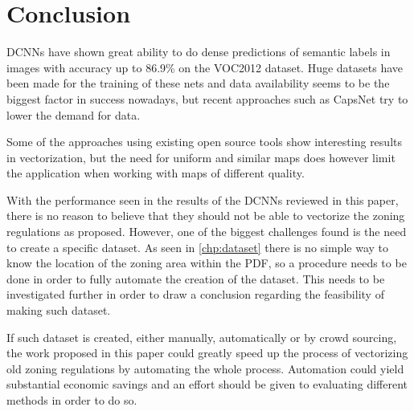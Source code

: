 \chapter{Conclusion}
DCNNs have shown great ability to do dense predictions of semantic labels in images with accuracy up to 86.9\% on the VOC2012 dataset. Huge datasets have been made for the training of these nets and data availability seems to be the biggest factor in success nowadays, but recent approaches such as CapsNet \cite{Sabour2017} try to lower the demand for data.

Some of the approaches using existing open source tools show interesting results in vectorization, but the need for uniform and similar maps does however limit the application when working with maps of different quality.

With the performance seen in the results of the DCNNs reviewed in this paper, there is no reason to believe that they should not be able to vectorize the zoning regulations as proposed. However, one of the biggest challenges found is the need to create a specific dataset. As seen in \autoref{chp:dataset} there is no simple way to know the location of the zoning area within the PDF, so a procedure needs to be done in order to fully automate the creation of the dataset. This needs to be investigated further in order to draw a conclusion regarding the feasibility of making such dataset.

If such dataset is created, either manually, automatically or by crowd sourcing, the work proposed in this paper could greatly speed up the process of vectorizing old zoning regulations by automating the whole process. Automation could yield substantial economic savings and an effort should be given to evaluating different methods in order to do so.